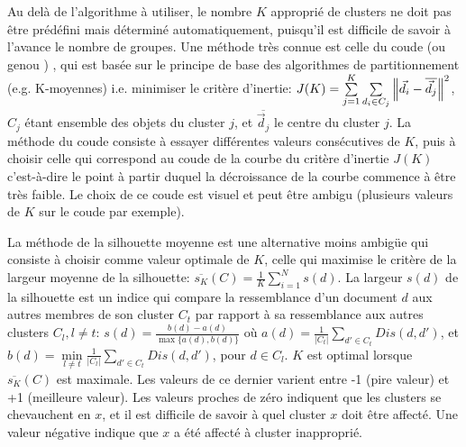  Au delà de l’algorithme à utiliser, le nombre $K$ approprié de clusters ne doit pas être prédéfini mais déterminé automatiquement, puisqu'il est difficile de savoir à l'avance le nombre de groupes. Une méthode très connue est celle du \og coude \fg{}  (ou \og genou \fg{}) \citep{halkidi2001clustvalidation}, qui est basée sur le principe de base des algorithmes de partitionnement (e.g. K-moyennes) i.e. minimiser le critère d'inertie:
{\footnotesize$J(K) = \sum\limits_{j=1}^K\sum\limits_{d_i \in C_j}\left\lVert\vec{d}_i-\overline{\vec{d}_j}\right\rVert^2$}, 
$C_j$ étant ensemble des objets du cluster $j$, et  $\overline{\vec{d}_j}$ le centre du cluster $j$. La méthode du coude consiste à essayer différentes valeurs consécutives de $K$, puis à choisir celle qui correspond au coude de la courbe du critère d'inertie $J(K)$ c'est-à-dire le point à partir duquel la décroissance de la courbe commence à être très faible. Le choix de ce coude est visuel et peut être ambigu (plusieurs valeurs de $K$ sur le coude par exemple). 

La méthode de la silhouette moyenne \citep{rousseeuw1987silhouetteclusternumber} est une alternative moins ambigüe qui consiste à choisir comme valeur optimale de $K$, celle qui maximise le critère de la largeur moyenne de la silhouette: $\overline{s_K}(C) = \frac{1}{K}\sum\limits_{i=1}^N s(d)$. La largeur $s(d)$ de la silhouette est un indice qui compare la ressemblance d'un document $d$ aux autres membres de son cluster $C_t$ par rapport à sa ressemblance aux autres clusters $C_l, l \neq t$:
$s(d) = \frac{b(d) - a(d)}{\max\lbrace a(d),b(d)\rbrace}$
où $a(d) = \frac{1}{\vert C_t \vert} \sum\limits_{d' \in C_t} Dis(d, d')$, et $b(d) = \min\limits_{l \neq t} \frac{1}{\vert C_l \vert} \sum\limits_{d' \in C_t} Dis(d, d')$, pour $d \in C_l$.
$K$ est optimal lorsque $\overline{s_K}(C)$ est maximale. Les valeurs de ce dernier varient entre -1 (pire valeur) et +1 (meilleure valeur). Les valeurs proches de zéro indiquent que les clusters se chevauchent en $x$, et il est difficile de savoir à quel cluster $x$ doit être affecté. Une valeur négative indique que $x$ a été affecté à cluster inapproprié.


